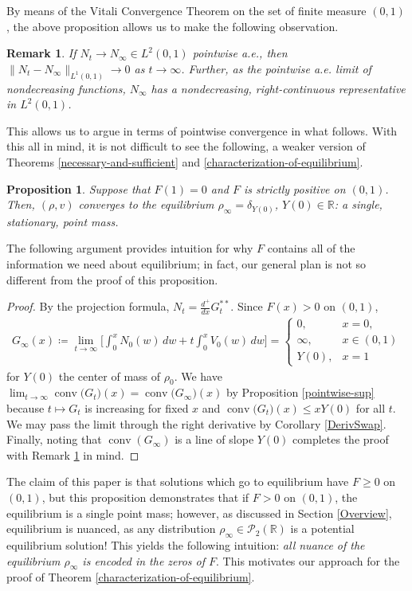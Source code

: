 \documentclass[11pt]{article}
\newtheorem{prop}[thm]{Proposition}
\newtheorem{remark}[thm]{Remark}
\numberwithin{equation}{section}
\DeclareMathOperator{\conv}{conv}
\begin{document}
    By means of the Vitali Convergence Theorem on the set of finite measure $(0,1)$, the above proposition allows us to make the following observation. 
    \begin{remark}\label{pointwise-to-L1}
        If $N_t\to N_\infty\in L^2(0,1)$ pointwise a.e., then $\|N_t-N_\infty\|_{L^1(0,1)}\to0$ as $t\to\infty$. Further, as the pointwise a.e. limit of nondecreasing functions, $N_\infty$ has a nondecreasing, right-continuous representative in $L^2(0,1)$. 
    \end{remark}
    This allows us to argue in terms of pointwise convergence in what follows. With this all in mind, it is not difficult to see the following, a weaker version of Theorems \ref{necessary-and-sufficient} and \ref{characterization-of-equilibrium}. 
    \begin{prop}\label{motivation-prop}
        Suppose that $F(1)=0$ and $F$ is strictly positive on $(0,1)$. Then, $(\rho,v)$ converges to the equilibrium $\rho_\infty=\delta_{Y(0)}$, $Y(0)\in\mathbb{R}$: a single, stationary, point mass. 
    \end{prop}
    The following argument provides intuition for why $F$ contains all of the information we need about equilibrium; in fact, our general plan is not so different from the proof of this proposition. 
    \begin{proof}
        By the projection formula, $N_t=\frac{d^+}{dx}G_t^{**}$. Since $F(x)>0$ on $(0,1)$,  
        \begin{align*}
            G_\infty(x)\coloneq\lim_{t\to\infty}\Big[\int_0^x N_0(w) \, dw+t\int_0^x V_0(w) \, dw\Big]=\begin{cases}
                0, &x=0,
                \\
                \infty, &x\in(0,1)
                \\
                Y(0), &x=1
            \end{cases}
        \end{align*}
        for $Y(0)$ the center of mass of $\rho_0$. We have $\lim_{t\to\infty}\conv\big(G_t\big)(x)=\conv\big(G_\infty\big)(x)$ by Proposition \ref{pointwise-sup} because $t\mapsto G_t$ is increasing for fixed $x$ and $\conv\big(G_t\big)(x)\leq xY(0)$ for all $t$. We may pass the limit through the right derivative by Corollary \ref{DerivSwap}. Finally, noting that $\conv(G_\infty)$ is a line of slope $Y(0)$ completes the proof with Remark \ref{pointwise-to-L1} in mind.
    \end{proof}
    The claim of this paper is that solutions which go to equilibrium have $F\geq0$ on $(0,1)$, but this proposition demonstrates that if $F>0$ on $(0,1)$, the equilibrium is a single point mass; however, as discussed in Section \ref{Overview}, equilibrium is nuanced, as any distribution $\rho_\infty\in\mathcal{P}_2(\mathbb{R})$ is a potential equilibrium solution! This yields the following intuition: \textit{all nuance of the equilibrium $\rho_\infty$ is encoded in the zeros of $F$}. This motivates our approach for the proof of Theorem \ref{characterization-of-equilibrium}.
\end{document}
